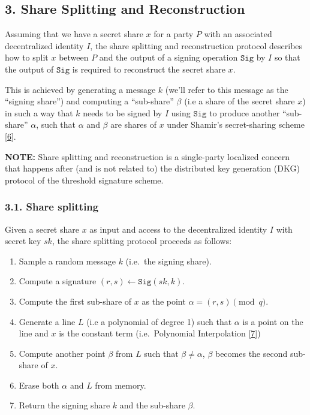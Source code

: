 \documentclass[
]{article}
\providecommand{\tightlist}{%
  \setlength{\itemsep}{0pt}\setlength{\parskip}{0pt}}
\begin{document}
\hypertarget{share-splitting-and-reconstruction}{%
\subsection{3. Share Splitting and
Reconstruction}\label{share-splitting-and-reconstruction}}

Assuming that we have a secret share \(x\) for a party \(P\) with an
associated decentralized identity \(I\), the share splitting and
reconstruction protocol describes how to split \(x\) between \(P\) and
the output of a signing operation \(\mathtt{Sig}\) by \(I\) so that the
output of \(\mathtt{Sig}\) is required to reconstruct the secret share
\(x\).

This is achieved by generating a message \(k\) (we'll refer to this
message as the ``signing share'') and computing a ``sub-share''
\(\beta\) (i.e a share of the secret share \(x\)) in such a way that
\(k\) needs to be signed by \(I\) using \(\mathtt{Sig}\) to produce
another ``sub-share'' \(\alpha\), such that \(\alpha\) and \(\beta\) are
shares of \(x\) under Shamir's secret-sharing scheme
{[}\protect\hyperlink{ref-sss79}{6}{]}.

\textbf{NOTE:} Share splitting and reconstruction is a single-party
localized concern that happens after (and is not related to) the
distributed key generation (DKG) protocol of the threshold signature
scheme.

\hypertarget{share-splitting}{%
\subsubsection{3.1. Share splitting}\label{share-splitting}}

Given a secret share \(x\) as input and access to the decentralized
identity \(I\) with secret key \(sk\), the share splitting protocol
proceeds as follows:

\begin{enumerate}
\def\labelenumi{\arabic{enumi}.}
\tightlist
\item
  Sample a random message \(k\) (i.e.~the signing share).
\item
  Compute a signature \((r, s) \leftarrow \mathtt{Sig}(sk, k)\).
\item
  Compute the first sub-share of \(x\) as the point
  \(\alpha = (r, s) \pmod q\).
\item
  Generate a line \(L\) (i.e a polynomial of degree 1) such that
  \(\alpha\) is a point on the line and \(x\) is the constant term
  (i.e.~Polynomial Interpolation
  {[}\protect\hyperlink{ref-wiki:interpolation}{7}{]})
\item
  Compute another point \(\beta\) from \(L\) such that
  \(\beta \neq \alpha\), \(\beta\) becomes the second sub-share of
  \(x\).
\item
  Erase both \(\alpha\) and \(L\) from memory.
\item
  Return the signing share \(k\) and the sub-share \(\beta\).
\end{enumerate}
\end{document}
